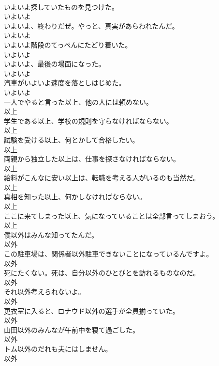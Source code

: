 \documentclass[8pt]{extreport}
\begin{document}
\begin{CJK}{UTF8}{min}
\\	いよいよ探していたものを見つけた。	
\\	いよいよ
\\	いよいよ、終わりだぜ。やっと、真実があらわれたんだ。	
\\	いよいよ
\\	いよいよ階段のてっぺんにたどり着いた。	
\\	いよいよ
\\	いよいよ、最後の場面になった。	
\\	いよいよ
\\	汽車がいよいよ速度を落としはじめた。	
\\	いよいよ
\\	一人でやると言った以上、他の人には頼めない。	
\\	以上
\\	学生である以上、学校の規則を守らなければならない。	
\\	以上
\\	試験を受ける以上、何とかして合格したい。	
\\	以上
\\	両親から独立した以上は、仕事を探さなければならない。	
\\	以上
\\	給料がこんなに安い以上は、転職を考える人がいるのも当然だ。	
\\	以上
\\	真相を知った以上、何かしなければならない。	
\\	以上
\\	ここに来てしまった以上、気になっていることは全部言ってしまおう。	
\\	以上
\\	僕以外はみんな知ってたんだ。	
\\	以外
\\	この駐車場は、関係者以外駐車できないことになっているんですよ。	
\\	以外
\\	死にたくない。死は、自分以外のひとびとを訪れるものなのだ。	
\\	以外
\\	それ以外考えられないよ。	
\\	以外
\\	更衣室に入ると、ロナウド以外の選手が全員揃っていた。	
\\	以外
\\	山田以外のみんなが午前中を寝て過ごした。	
\\	以外
\\	トム以外のだれも夫にはしません。	
\\	以外

\end{CJK}
\end{document}
